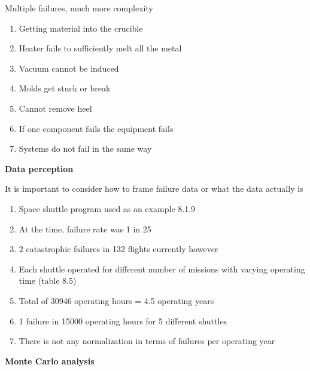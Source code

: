 \documentclass[aspectratio=1610,pdftex,dvipsnames,compress,xcolor={dvipsnames}]{beamer}
\begin{document}
\begin{frame}{Multiple failures, much more complexity}
    \begin{enumerate}[series=outerlist,topsep=0pt,itemsep=15pt,leftmargin=*,label=(\arabic*)]
        \item[]Getting material into the crucible
        \item[]Heater fails to sufficiently melt all the metal  
        \item[]Vacuum cannot be induced  
        \item[]Molds get stuck or break  
        \item[]Cannot remove heel  
        \item[]If one component fails the equipment fails
        \item[]Systems do not fail in the same way
    \end{enumerate}
\end{frame}


\begin{frame}[plain]{}
    \centering\LARGE\textbf{Data perception}
\end{frame}


\addtocounter{framenumber}{-1}
\begin{frame}{It is important to consider how to frame failure data or what the data actually is}
    \begin{enumerate}[series=outerlist,topsep=0pt,itemsep=11pt,leftmargin=*,label=(\arabic*)]
        \item[]Space shuttle program used as an example 8.1.9  
        \item[]At the time, failure rate was 1 in 25  
        \item[]2 catastrophic failures in 132 flights currently however
        \item[]Each shuttle operated for different number of missions with varying operating time (table 8.5)
        \item[]Total of 30946 operating hours = 4.5 operating years  
        \item[]1 failure in 15000 operating hours for 5 different shuttles  
        \item[]There is not any normalization in terms of failures per operating year
    \end{enumerate}
\end{frame}


\begin{frame}[plain]{}
    \centering\LARGE\textbf{Monte Carlo analysis}
\end{frame}
\end{document}
